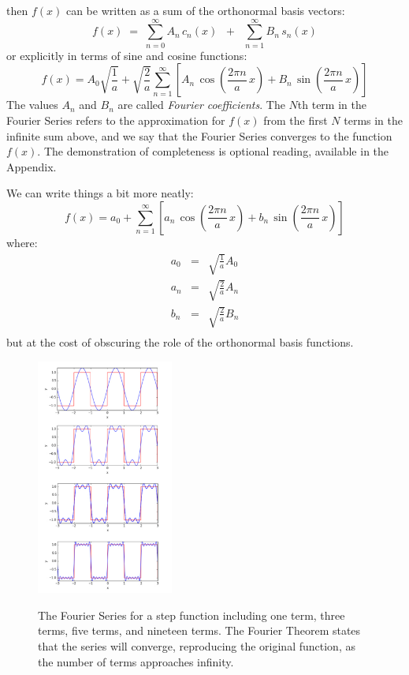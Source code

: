 \documentclass[12pt]{book}
\begin{document}
then $f(x)$ can be written as a sum of the orthonormal basis vectors:
\begin{equation}
f(x) \; = \; \sum_{n=0}^{\infty}  A_n \, c_n(x)  \; \; + \; \; \sum_{n=1}^{\infty} B_n \, s_n(x) \label{eqn:bfs}
\end{equation}
or explicitly in terms of sine and cosine functions:
\begin{equation}
f(x) = A_0 \sqrt{\frac{1}{a}} + \sqrt{\frac{2}{a}} \sum_{n=1}^{\infty}  \left[ A_n \, \cos\left(\frac{2\pi n}{a} \, x \right) + B_n \, \sin\left(\frac{2\pi n}{a} \, x \right)\right]\label{eqn :lfs}
\end{equation}
The values $A_n$ and $B_n$ are called {\em Fourier coefficients}.  The $N$th term in the Fourier Series refers to the approximation for $f(x)$ from the first $N$ terms in the infinite sum above, and we say that the Fourier Series converges to the function $f(x)$.  The demonstration of completeness is optional reading, available in the Appendix.

We can write things a bit more neatly:
\begin{equation}
f(x) = a_0 + \sum_{n=1}^{\infty}  \left[ a_n \, \cos\left(\frac{2\pi n}{a} \, x \right) + b_n \, \sin\left(\frac{2\pi n}{a} \, x \right) \right]\label{eqn:lfs}
\end{equation}
where:
\begin{eqnarray*}
a_0 &=& \sqrt{\frac{1}{a}} A_0\\
a_n &=& \sqrt{\frac{2}{a}} A_n\\
b_n &=& \sqrt{\frac{2}{a}} B_n\\
\end{eqnarray*}
but at the cost of obscuring the role of the orthonormal basis functions.

\begin{figure}[thb]
\begin{center}
{\includegraphics[width=0.40\textwidth]{figs/fsall.pdf}}
\end{center}
\caption{\label{fig:fall} The Fourier Series for a step function including one term, three terms, five terms, and nineteen terms.  The Fourier Theorem states that the series will converge, reproducing the original function, as the number of terms approaches infinity.}
\end{figure}
\end{document}

